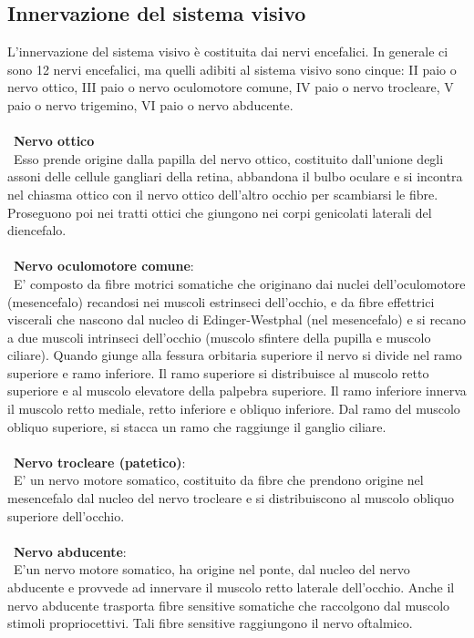 \subsection{Innervazione del sistema visivo}

L’innervazione del sistema visivo è costituita dai nervi encefalici. In generale ci sono 12 nervi encefalici, ma quelli adibiti al sistema visivo sono cinque: II paio o nervo ottico, III paio o nervo oculomotore comune, IV paio o nervo trocleare, V paio o nervo trigemino, VI paio o nervo abducente.
\\\ \\\
\textbf{Nervo ottico}
\\\ 
Esso prende origine dalla papilla del nervo ottico, costituito dall’unione degli assoni delle cellule gangliari della retina, abbandona il bulbo oculare e si incontra nel chiasma ottico con il nervo ottico dell'altro occhio per scambiarsi le fibre. Proseguono poi nei tratti ottici che giungono nei corpi genicolati laterali del diencefalo.
\\\ \\\
\textbf{Nervo oculomotore comune}: 
\\\ E' composto da fibre motrici somatiche che originano dai nuclei dell’oculomotore (mesencefalo) recandosi nei muscoli estrinseci dell’occhio, e da fibre effettrici 	viscerali che nascono dal nucleo di Edinger-Westphal (nel mesencefalo) e si recano a due muscoli intrinseci dell’occhio (muscolo sfintere della pupilla e muscolo ciliare). Quando giunge alla fessura orbitaria superiore il nervo si divide nel ramo superiore e ramo inferiore. Il ramo superiore si distribuisce al muscolo retto superiore e al muscolo elevatore della palpebra superiore. Il ramo inferiore innerva il muscolo retto mediale, retto inferiore e obliquo inferiore. Dal ramo del muscolo obliquo superiore, si stacca un ramo che raggiunge il ganglio ciliare.
\\\ \\\
\textbf{Nervo trocleare (patetico)}: 
\\\
E' un nervo motore somatico, costituito da fibre che prendono origine nel mesencefalo dal nucleo del nervo trocleare e si distribuiscono al muscolo obliquo superiore dell’occhio.
\\\ \\\
\textbf{Nervo abducente}: 
\\\ E'un nervo motore somatico, ha origine nel ponte, dal nucleo del nervo abducente e provvede ad innervare il muscolo retto laterale dell’occhio. Anche il nervo abducente trasporta fibre sensitive somatiche che raccolgono dal muscolo stimoli propriocettivi. Tali fibre sensitive raggiungono il nervo oftalmico.
